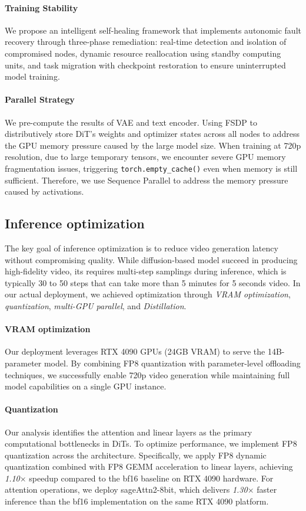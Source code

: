 \documentclass{article}
\begin{document}
{\paragraph{Training Stability}
We propose an intelligent self-healing framework that implements autonomic fault recovery through three-phase remediation: real-time detection and isolation of compromised nodes, dynamic resource reallocation using standby computing units, and task migration with checkpoint restoration to ensure uninterrupted model training.

\paragraph{Parallel Strategy}
We pre-compute the results of VAE and text encoder. Using FSDP to distributively store DiT's weights and optimizer states across all nodes to address the GPU memory pressure caused by the large model size.
When training at 720p resolution, due to large temporary tensors, we encounter severe GPU memory fragmentation issues, triggering \verb|torch.empty_cache()| even when memory is still sufficient. Therefore, we use Sequence Parallel \cite{jacobs2023deepspeedulyssesoptimizationsenabling} to address the memory pressure caused by activations.

\subsection{Inference optimization}

The key goal of inference optimization is to reduce video generation latency without compromising quality. While diffusion-based model succeed in producing high-fidelity video, its requires multi-step samplings
during inference, which is typically 30 to 50 steps that can take more than 5 minutes for 5 seconds video. In our actual deployment, we achieved optimization through \emph{VRAM optimization}, \emph{quantization}, \emph{multi-GPU parallel}, and \emph{Distillation}.
\paragraph{VRAM optimization} Our deployment leverages RTX 4090 GPUs (24GB VRAM) to serve the 14B-parameter model. By combining FP8 quantization with parameter-level offloading techniques, we successfully enable 720p video generation while maintaining full model capabilities on a single GPU instance.
\paragraph{Quantization} Our analysis identifies the attention  and linear layers as the primary computational bottlenecks in DiTs. To optimize performance, we implement FP8 quantization across the architecture. Specifically, we apply FP8 dynamic quantization combined with FP8 GEMM acceleration to linear layers, achieving \emph{1.10$\times$} speedup compared to the bf16 baseline on RTX 4090 hardware. For attention operations, we deploy sageAttn2-8bit\cite{zhang2025sageattention2efficientattentionthorough}, which delivers \emph{1.30$\times$} faster inference than the bf16 implementation on the same RTX 4090 platform.
}
\end{document}
